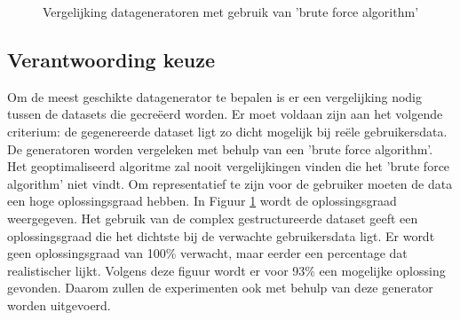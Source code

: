 \documentclass[Main.tex]{subfiles}
\begin{document}
\begin{figure}
\centering
{}
\caption{Vergelijking datageneratoren met gebruik van 'brute force algorithm'} \label{fig:datageneratoren}
\end{figure}

\subsection{Verantwoording keuze}
Om de meest geschikte datagenerator te bepalen is er een vergelijking nodig tussen de datasets die gecre\"eerd worden. Er moet voldaan zijn aan het volgende criterium: de gegenereerde dataset ligt zo dicht mogelijk bij re\"ele gebruikersdata. De generatoren worden vergeleken met behulp van een 'brute force algorithm'. Het geoptimaliseerd algoritme zal nooit vergelijkingen vinden die het 'brute force algorithm' niet vindt. Om representatief te zijn voor de gebruiker moeten de data een hoge oplossingsgraad hebben. In Figuur \ref{fig:datageneratoren} wordt de oplossingsgraad weergegeven. Het gebruik van de complex gestructureerde dataset geeft een oplossingsgraad die het dichtste bij de verwachte gebruikersdata ligt. Er wordt geen oplossingsgraad van 100\% verwacht, maar eerder een percentage dat realistischer lijkt. Volgens deze figuur wordt er voor 93\% een mogelijke oplossing gevonden. Daarom zullen de experimenten ook met behulp van deze generator worden uitgevoerd.
\end{document}
